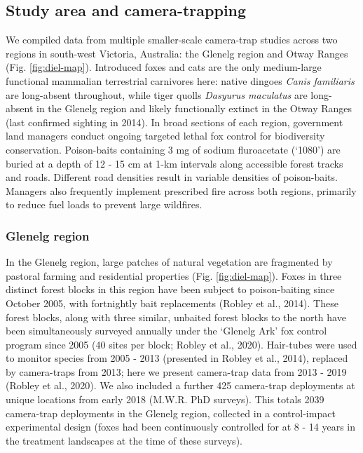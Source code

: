 \documentclass[]{elsarticle} %
\begin{document}
\hypertarget{study-area-and-camera-trapping}{%
\subsection{Study area and camera-trapping}\label{study-area-and-camera-trapping}}

We compiled data from multiple smaller-scale camera-trap studies across two regions in south-west Victoria, Australia: the Glenelg region and Otway Ranges (Fig. \ref{fig:diel-map}). Introduced foxes and cats are the only medium-large functional mammalian terrestrial carnivores here: native dingoes \emph{Canis familiaris} are long-absent throughout, while tiger quolls \emph{Dasyurus maculatus} are long-absent in the Glenelg region and likely functionally extinct in the Otway Ranges (last confirmed sighting in 2014). In broad sections of each region, government land managers conduct ongoing targeted lethal fox control for biodiversity conservation. Poison-baits containing 3 mg of sodium fluroacetate (`1080') are buried at a depth of 12 - 15 cm at 1-km intervals along accessible forest tracks and roads. Different road densities result in variable densities of poison-baits. Managers also frequently implement prescribed fire across both regions, primarily to reduce fuel loads to prevent large wildfires.

\hypertarget{glenelg-region}{%
\subsubsection{Glenelg region}\label{glenelg-region}}

In the Glenelg region, large patches of natural vegetation are fragmented by pastoral farming and residential properties (Fig. \ref{fig:diel-map}). Foxes in three distinct forest blocks in this region have been subject to poison-baiting since October 2005, with fortnightly bait replacements (Robley et al., 2014). These forest blocks, along with three similar, unbaited forest blocks to the north have been simultaneously surveyed annually under the `Glenelg Ark' fox control program since 2005 (40 sites per block; Robley et al., 2020). Hair-tubes were used to monitor species from 2005 - 2013 (presented in Robley et al., 2014), replaced by camera-traps from 2013; here we present camera-trap data from 2013 - 2019 (Robley et al., 2020). We also included a further 425 camera-trap deployments at unique locations from early 2018 (M.W.R. PhD surveys). This totals 2039 camera-trap deployments in the Glenelg region, collected in a control-impact experimental design (foxes had been continuously controlled for at 8 - 14 years in the treatment landscapes at the time of these surveys).
\end{document}
